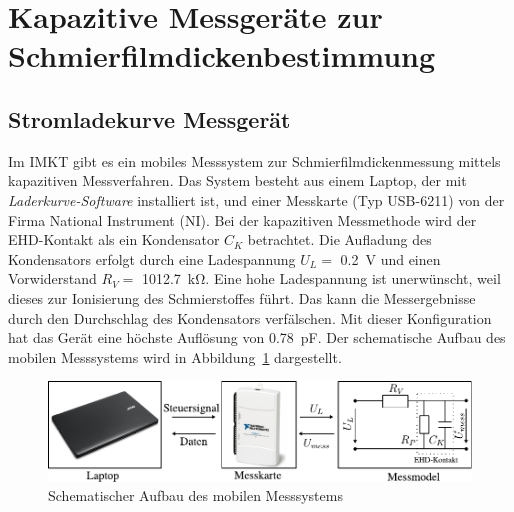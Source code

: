 \section{Kapazitive Messgeräte zur Schmierfilmdickenbestimmung}
\label{sec:kapazitive_messgeraete_zur_schmierfilmdickenbestimmung}

\subsection{Stromladekurve Messgerät}
\label{sub:stromladekurve_messgeraet}

Im IMKT gibt es ein mobiles Messsystem zur Schmierfilmdickenmessung mittels kapazitiven Messverfahren.
Das System besteht aus einem Laptop, der mit \textit{Laderkurve-Software} installiert ist, und einer Messkarte (Typ USB-6211) von der Firma National Instrument (NI).
Bei der kapazitiven Messmethode wird der EHD-Kontakt als ein Kondensator $C_K$ betrachtet.
Die Aufladung des Kondensators erfolgt durch eine Ladespannung $U_L =$ \SI{0,2}{\volt} und einen Vorwiderstand $R_V =$ \SI{1012.7}{\kilo\ohm}.
Eine hohe Ladespannung ist unerwünscht, weil dieses zur Ionisierung des Schmierstoffes führt.
Das kann die Messergebnisse durch den Durchschlag des Kondensators verfälschen.
Mit dieser Konfiguration hat das Gerät eine höchste Auflösung von \SI{0.78}{\pico\farad}.
Der schematische Aufbau des mobilen Messsystems wird in Abbildung~\ref{fig:schematischer_aufbau_des_mobilen_messsystems} dargestellt.

\begin{figure}[htb]
    \centering
    \includegraphics[]{./images/schematischer_aufbau_des_mobilen_messsystem.pdf}
    \caption{Schematischer Aufbau des mobilen Messsystems}
    \label{fig:schematischer_aufbau_des_mobilen_messsystems}
\end{figure}

